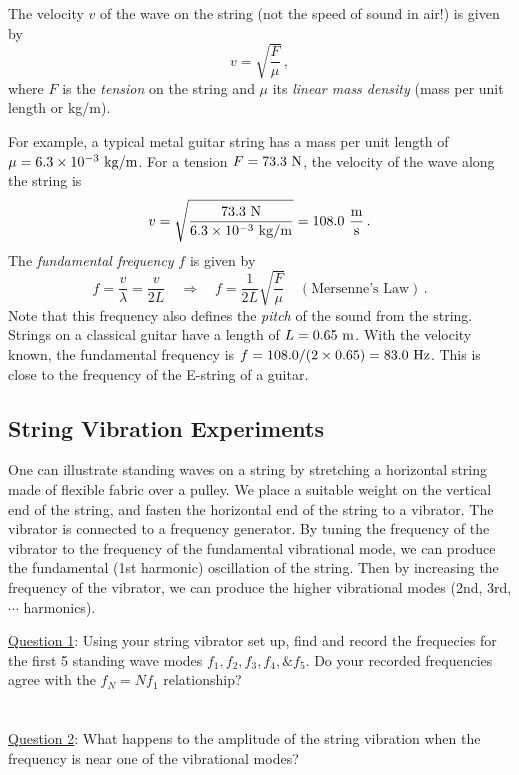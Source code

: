 \documentclass[11pt]{NSF}
\def\be{\begin{equation}}
\def\ee{\end{equation}}
\begin{document}
The velocity $v$ of the wave on the string 
(not the speed of sound in air!) is given by
%
\be
v = \sqrt{\frac{F}{\mu}}\,,
\ee
%
where $F$ is the {\em tension} on the string and $\mu$ its 
{\em linear mass density} (mass per unit length or kg/m).

For example, a typical metal guitar string has a mass per 
unit length of $\mu = 6.3\times 10^{-3}~{\rm kg/m}$. 
For a tension $F =73.3~{\rm N}$, the velocity of the wave 
along the string is
%
\be
v=\sqrt{\frac{73.3~{\rm N}}{6.3\times 10^{-3}~{\rm kg/m}}}
=108.0~\frac{{\rm m}}{{\rm s}}\,.
\ee
%
The {\em fundamental frequency} $f$ is given by
%
\be
f=\frac{v}{\lambda} = \frac{v}{2L}
\quad\Rightarrow\quad
f=\frac{1}{2L}\sqrt{\frac{F}{\mu}}
\quad(\text{Mersenne's Law})\,.
\ee
%
Note that this frequency also defines the {\em pitch} of 
the sound from the string. Strings on a classical
guitar have a length of $L= 0.65~{\rm m}$. 
With the velocity known, the fundamental frequency is
$f= 108.0/(2\times 0.65)=83.0~{\rm Hz}$.
This is close to the frequency of the E-string of a guitar.


\subsection{String Vibration Experiments}

One can illustrate standing waves on a string by stretching 
a horizontal string made of flexible fabric over a pulley. 
We place a suitable weight on the vertical end of the string,
and fasten the horizontal end of the string to a vibrator. 
The vibrator is connected to a frequency generator. 
By tuning the frequency of the vibrator to the 
frequency of the fundamental vibrational mode,
we can produce the fundamental (1st harmonic) 
oscillation of the string. 
Then by increasing the frequency of the vibrator,
we can produce the higher
vibrational modes (2nd, 3rd, $\cdots$ harmonics).

\underline{Question 1}: Using your string vibrator set up, find and record the frequecies for the first 5 standing wave modes $f_1, f_2, f_3,  f_4, \& f_5$. Do your recorded frequencies agree with the $f_N = Nf_1$ relationship? 
\\
\\
\\

\underline{Question 2}: What happens to the amplitude of the string vibration when the frequency is near one of the vibrational modes?
\\
\\
\\
\end{document}
